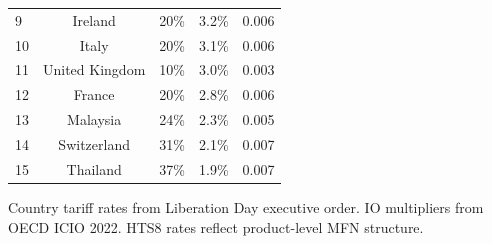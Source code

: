 \begin{table}[H]
\begin{tabular}{lcccc}
9 & Ireland & 20\% & 3.2\% & 0.006 \\
10 & Italy & 20\% & 3.1\% & 0.006 \\
11 & United Kingdom & 10\% & 3.0\% & 0.003 \\
12 & France & 20\% & 2.8\% & 0.006 \\
13 & Malaysia & 24\% & 2.3\% & 0.005 \\
14 & Switzerland & 31\% & 2.1\% & 0.007 \\
15 & Thailand & 37\% & 1.9\% & 0.007 \\
\bottomrule
\end{tabular}
\begin{tablenotes}
\small
\item Country tariff rates from Liberation Day executive order. IO multipliers from OECD ICIO 2022. HTS8 rates reflect product-level MFN structure.
\end{tablenotes}
\end{table}